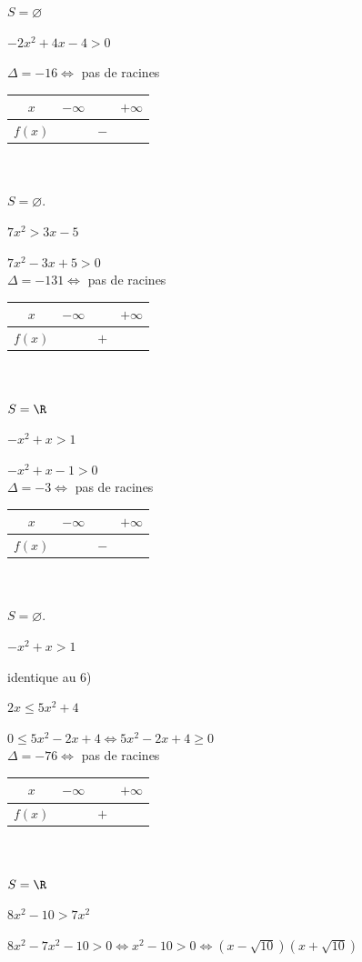 \documentclass[11pt,a4paper]{article}  %
\begin{document}
\begin{enumMet}
\begin{corrBox}
		$S=\varnothing$
	\end{corrBox}
	\item $-2 x^2+4 x-4>0$
	\begin{corrBox}
		$\Delta=-16\iff$ pas de racines\\
		\begin{tabular}{|c|lll|}
			\hline$x$ & $-\infty$ & & $+\infty$ \\
			\hline$f(x)$ & & $-$ & \\
			\hline
		\end{tabular}\\
		\ \\
		$S=\varnothing$.
	\end{corrBox}
	\item $7 x^2>3 x-5$
	\begin{corrBox}
		$7 x^2-3 x+5>0$\\
		$\Delta=-131\iff$ pas de racines\\
		\begin{tabular}{|c|lll|}
			\hline$x$ & $-\infty$ & & $+\infty$ \\
			\hline$f(x)$ & & $+$ & \\
			\hline
		\end{tabular}\\
		\ \\
		$S=\R$
	\end{corrBox}
	\item $-x^2+x>1$
	\begin{corrBox}
		$-x^2+x-1>0$\\
		$\Delta=-3\iff$ pas de racines\\
		\begin{tabular}{|c|lll|}
			\hline$x$ & $-\infty$ & & $+\infty$ \\
			\hline$f(x)$ & & $-$ & \\
			\hline
		\end{tabular}\\
		\ \\
		$S=\varnothing$.
	\end{corrBox}
	\item $-x^2+x>1$
	\begin{corrBox}
		identique au 6)
	\end{corrBox}
	\item $2 x \leqslant 5 x^2+4$
	\begin{corrBox}
		$0 \leqslant 5 x^2-2x+4\iff 5 x^2-2x+4\geqslant 0$\\
		$\Delta=-76\iff$ pas de racines\\
		\begin{tabular}{|c|lll|}
			\hline$x$ & $-\infty$ & & $+\infty$ \\
			\hline$f(x)$ & & $+$ & \\
			\hline
		\end{tabular}\\
		\ \\
		$S=\R $
	\end{corrBox}
	\item $8 x^2-10>7 x^2$
	\begin{corrBox}
		$8 x^2-7x^2-10>0\iff x^2-10>0 \iff (x-\sqrt{10})(x+\sqrt{10})$\\
		

\end{corrBox}
\end{enumMet}
\end{document}
